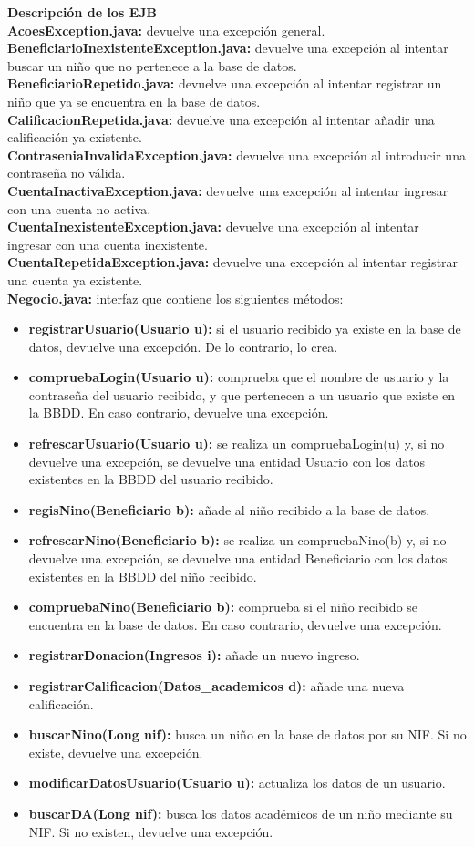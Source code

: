 \documentclass{article}
\begin{document}
\textbf{Descripción de los EJB}\\
\textbf{AcoesException.java:} devuelve una excepción general.\\
\textbf{BeneficiarioInexistenteException.java:} devuelve una excepción al intentar buscar un niño que no pertenece a la base de datos.\\
\textbf{BeneficiarioRepetido.java:} devuelve una excepción al intentar registrar un niño que ya se encuentra en la base de datos.\\
\textbf{CalificacionRepetida.java:} devuelve una excepción al intentar añadir una calificación ya existente.\\
\textbf{ContraseniaInvalidaException.java:} devuelve una excepción al introducir una contraseña no válida.\\
\textbf{CuentaInactivaException.java:} devuelve una excepción al intentar ingresar con una cuenta no activa.\\
\textbf{CuentaInexistenteException.java:} devuelve una excepción al intentar ingresar con una cuenta inexistente.\\
\textbf{CuentaRepetidaException.java:} devuelve una excepción al intentar registrar una cuenta ya existente.\\
\textbf{Negocio.java:} interfaz que contiene los siguientes métodos:
\begin{itemize}
\item \textbf{registrarUsuario(Usuario u):} si el usuario recibido ya existe en la base de datos, devuelve una excepción. De lo contrario, lo crea.
\item \textbf{compruebaLogin(Usuario u):} comprueba que el nombre de usuario y la contraseña del usuario recibido, y que pertenecen a un usuario que existe en la BBDD. En caso contrario, devuelve una excepción.
\item \textbf{refrescarUsuario(Usuario u):} se realiza un compruebaLogin(u) y, si no devuelve una excepción, se devuelve una entidad Usuario con los datos existentes en la BBDD del usuario recibido.
\item \textbf{regisNino(Beneficiario b):} añade al niño recibido a la base de datos.
\item \textbf{refrescarNino(Beneficiario b):} se realiza un compruebaNino(b) y, si no devuelve una excepción, se devuelve una entidad Beneficiario con los datos existentes en la BBDD del niño recibido.
\item \textbf{compruebaNino(Beneficiario b):} comprueba si el niño recibido se encuentra en la base de datos. En caso contrario, devuelve una excepción.
\item \textbf{registrarDonacion(Ingresos i):} añade un nuevo ingreso.
\item \textbf{registrarCalificacion(Datos\_academicos d):} añade una nueva calificación.
\item \textbf{buscarNino(Long nif):} busca un niño en la base de datos por su NIF. Si no existe, devuelve una excepción.
\item \textbf{modificarDatosUsuario(Usuario u):} actualiza los datos de un usuario.
\item \textbf{buscarDA(Long nif):} busca los datos académicos de un niño mediante su NIF. Si no existen, devuelve una excepción.
\end{itemize}
\end{document}
